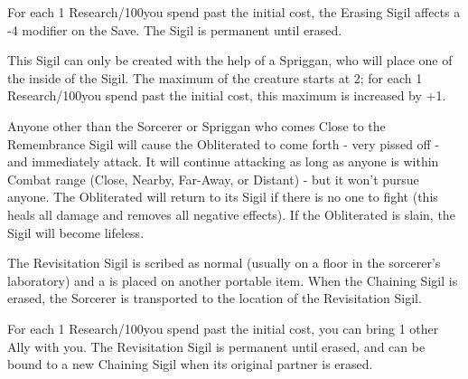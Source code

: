 
For each 1 Research/100\AU you spend past the initial cost, the Erasing Sigil affects a -4 modifier on the Save.  The Sigil is permanent until erased. 



This Sigil can only be created with the help of a Spriggan, who will place one of the  inside of the Sigil.  The maximum \HD of the creature starts at 2; for each 1 Research/100\AU you spend past the initial cost, this maximum is increased by +1.

Anyone other than the Sorcerer or Spriggan who comes Close to the Remembrance Sigil will cause the Obliterated to come forth - very pissed off - and immediately attack.  It will continue attacking as long as anyone is within Combat range (Close, Nearby, Far-Away, or Distant) - but it won't pursue anyone.  The Obliterated will return to its Sigil if there is no one to fight (this heals all damage and removes all negative effects).  If the Obliterated is slain, the Sigil will become lifeless.

\cbreak



The Revisitation Sigil is scribed as normal (usually on a floor in the sorcerer's laboratory) and a  is placed on another portable item.  When the Chaining Sigil is erased, the Sorcerer is transported to the location of the Revisitation Sigil.  

For each 1 Research/100\AU you spend past the initial cost, you can bring 1 other Ally with you.  The Revisitation Sigil is permanent until erased, and can be bound to a new Chaining Sigil when its original partner is erased.


\newpage
